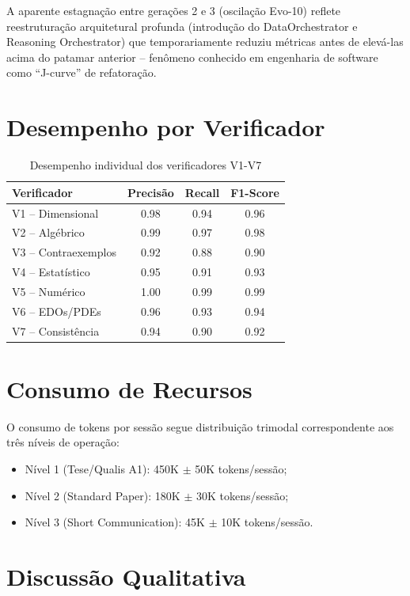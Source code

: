 \documentclass[12pt,a4paper,sumario=tradicional]{abntex2}
\begin{document}
A aparente estagnação entre gerações 2 e 3 (oscilação Evo-10) reflete reestruturação arquitetural profunda (introdução do DataOrchestrator e Reasoning Orchestrator) que temporariamente reduziu métricas antes de elevá-las acima do patamar anterior -- fenômeno conhecido em engenharia de software como ``J-curve'' de refatoração.

\section{Desempenho por Verificador}

\begin{table}[H]
\centering
\caption{Desempenho individual dos verificadores V1-V7}
\label{tab:verifier-perf}
\begin{tabular}{@{}lccc@{}}
\toprule
\textbf{Verificador} & \textbf{Precisão} & \textbf{Recall} & \textbf{F1-Score} \\
\midrule
V1 -- Dimensional & 0.98 & 0.94 & 0.96 \\
V2 -- Algébrico & 0.99 & 0.97 & 0.98 \\
V3 -- Contraexemplos & 0.92 & 0.88 & 0.90 \\
V4 -- Estatístico & 0.95 & 0.91 & 0.93 \\
V5 -- Numérico & 1.00 & 0.99 & 0.99 \\
V6 -- EDOs/PDEs & 0.96 & 0.93 & 0.94 \\
V7 -- Consistência & 0.94 & 0.90 & 0.92 \\
\bottomrule
\end{tabular}
\end{table}

\section{Consumo de Recursos}

O consumo de tokens por sessão segue distribuição trimodal correspondente aos três níveis de operação:

\begin{itemize}
    \item Nível 1 (Tese/Qualis A1): 450K $\pm$ 50K tokens/sessão;
    \item Nível 2 (Standard Paper): 180K $\pm$ 30K tokens/sessão;
    \item Nível 3 (Short Communication): 45K $\pm$ 10K tokens/sessão.
\end{itemize}

\section{Discussão Qualitativa}
\end{document}
